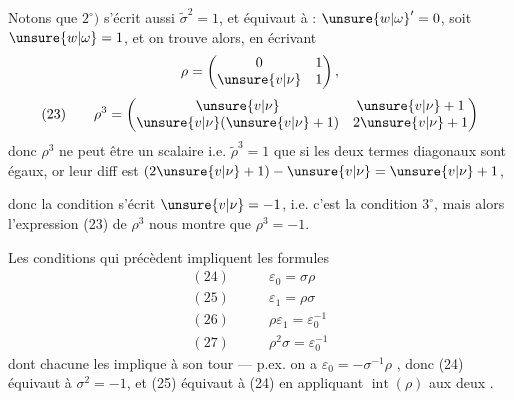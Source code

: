 
Notons que $2^\circ)$ s'écrit aussi $\widetilde\sigma^2=1$, et équivaut à : $\unsure{w|\omega}'=0$, soit $\unsure{w|\omega}=1$, et on trouve alors, en écrivant \deleted{\unsure{$\rho=$}} 
\[
\rho=\begin{pmatrix}0&1\\\unsure{v|\nu}&1\end{pmatrix},
\]
\[
(23)\qquad
\rho^3=\begin{pmatrix}\unsure{v|\nu}&\unsure{v|\nu}+1\\\unsure{v|\nu}(\unsure{v|\nu}+1)&2\unsure{v|\nu}+1\end{pmatrix}
\]
donc $\rho^3$ ne peut être un scalaire i.e. $\widetilde\rho^3=1$ que si les deux termes diagonaux sont égaux, or leur diff est $(2\unsure{v|\nu}+1)-\unsure{v|\nu}=\unsure{v|\nu}+1$,



donc la condition s'écrit $\unsure{v|\nu}=-1$, i.e. c'est la condition $3^\circ$, mais alors l'expression (23) de $\rho^3$ nous montre que $\rho^3=-1$.

\uline{} Les conditions qui précèdent impliquent les formules
\[
\begin{aligned}
(24)\qquad &\varepsilon_0=\sigma\rho\\
(25)\qquad &\varepsilon_1=\rho\sigma\\
(26)\qquad &\rho\varepsilon_1=\varepsilon_0^{-1}\\
(27)\qquad &\rho^2\sigma=\varepsilon_0^{-1}
\end{aligned}
\]
dont chacune  les implique à son tour
--- p.ex. on a $\varepsilon_0=-\sigma^{-1}\rho$ , donc (24) équivaut à  $\sigma^2=-1$, et (25) équivaut à (24) en appliquant $\operatorname{int}(\rho)$ aux deux .

